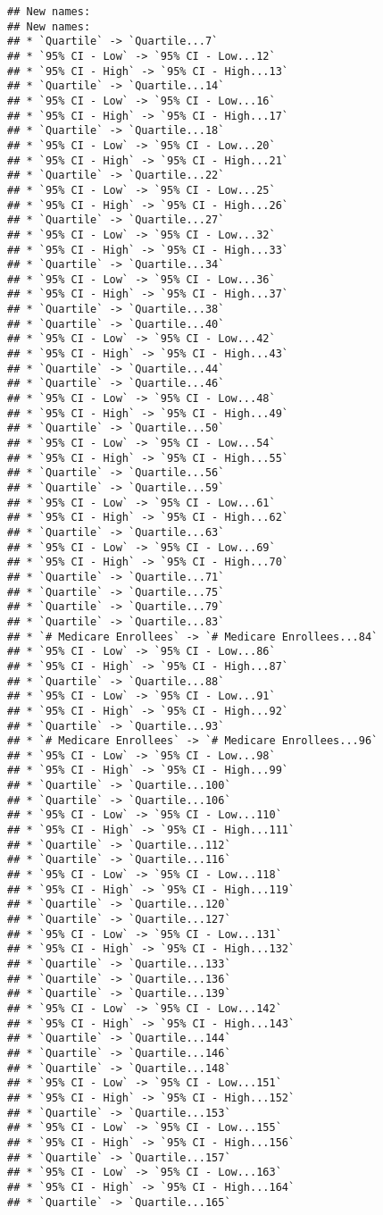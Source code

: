 \documentclass[
]{article}
\begin{document}
\begin{verbatim}
## New names:
## New names:
## * `Quartile` -> `Quartile...7`
## * `95% CI - Low` -> `95% CI - Low...12`
## * `95% CI - High` -> `95% CI - High...13`
## * `Quartile` -> `Quartile...14`
## * `95% CI - Low` -> `95% CI - Low...16`
## * `95% CI - High` -> `95% CI - High...17`
## * `Quartile` -> `Quartile...18`
## * `95% CI - Low` -> `95% CI - Low...20`
## * `95% CI - High` -> `95% CI - High...21`
## * `Quartile` -> `Quartile...22`
## * `95% CI - Low` -> `95% CI - Low...25`
## * `95% CI - High` -> `95% CI - High...26`
## * `Quartile` -> `Quartile...27`
## * `95% CI - Low` -> `95% CI - Low...32`
## * `95% CI - High` -> `95% CI - High...33`
## * `Quartile` -> `Quartile...34`
## * `95% CI - Low` -> `95% CI - Low...36`
## * `95% CI - High` -> `95% CI - High...37`
## * `Quartile` -> `Quartile...38`
## * `Quartile` -> `Quartile...40`
## * `95% CI - Low` -> `95% CI - Low...42`
## * `95% CI - High` -> `95% CI - High...43`
## * `Quartile` -> `Quartile...44`
## * `Quartile` -> `Quartile...46`
## * `95% CI - Low` -> `95% CI - Low...48`
## * `95% CI - High` -> `95% CI - High...49`
## * `Quartile` -> `Quartile...50`
## * `95% CI - Low` -> `95% CI - Low...54`
## * `95% CI - High` -> `95% CI - High...55`
## * `Quartile` -> `Quartile...56`
## * `Quartile` -> `Quartile...59`
## * `95% CI - Low` -> `95% CI - Low...61`
## * `95% CI - High` -> `95% CI - High...62`
## * `Quartile` -> `Quartile...63`
## * `95% CI - Low` -> `95% CI - Low...69`
## * `95% CI - High` -> `95% CI - High...70`
## * `Quartile` -> `Quartile...71`
## * `Quartile` -> `Quartile...75`
## * `Quartile` -> `Quartile...79`
## * `Quartile` -> `Quartile...83`
## * `# Medicare Enrollees` -> `# Medicare Enrollees...84`
## * `95% CI - Low` -> `95% CI - Low...86`
## * `95% CI - High` -> `95% CI - High...87`
## * `Quartile` -> `Quartile...88`
## * `95% CI - Low` -> `95% CI - Low...91`
## * `95% CI - High` -> `95% CI - High...92`
## * `Quartile` -> `Quartile...93`
## * `# Medicare Enrollees` -> `# Medicare Enrollees...96`
## * `95% CI - Low` -> `95% CI - Low...98`
## * `95% CI - High` -> `95% CI - High...99`
## * `Quartile` -> `Quartile...100`
## * `Quartile` -> `Quartile...106`
## * `95% CI - Low` -> `95% CI - Low...110`
## * `95% CI - High` -> `95% CI - High...111`
## * `Quartile` -> `Quartile...112`
## * `Quartile` -> `Quartile...116`
## * `95% CI - Low` -> `95% CI - Low...118`
## * `95% CI - High` -> `95% CI - High...119`
## * `Quartile` -> `Quartile...120`
## * `Quartile` -> `Quartile...127`
## * `95% CI - Low` -> `95% CI - Low...131`
## * `95% CI - High` -> `95% CI - High...132`
## * `Quartile` -> `Quartile...133`
## * `Quartile` -> `Quartile...136`
## * `Quartile` -> `Quartile...139`
## * `95% CI - Low` -> `95% CI - Low...142`
## * `95% CI - High` -> `95% CI - High...143`
## * `Quartile` -> `Quartile...144`
## * `Quartile` -> `Quartile...146`
## * `Quartile` -> `Quartile...148`
## * `95% CI - Low` -> `95% CI - Low...151`
## * `95% CI - High` -> `95% CI - High...152`
## * `Quartile` -> `Quartile...153`
## * `95% CI - Low` -> `95% CI - Low...155`
## * `95% CI - High` -> `95% CI - High...156`
## * `Quartile` -> `Quartile...157`
## * `95% CI - Low` -> `95% CI - Low...163`
## * `95% CI - High` -> `95% CI - High...164`
## * `Quartile` -> `Quartile...165`
\end{verbatim}
\end{document}
